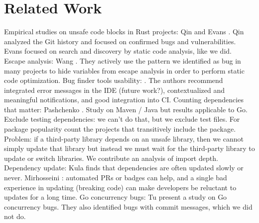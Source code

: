 \section{Related Work}
\label{sec:rw}

Empirical studies on unsafe code blocks in Rust projects: Qin \cite{qin2020} and Evans \cite{evans2020}.
Qin analyzed the Git history and focused on confirmed bugs and vulnerabilities.
Evans focused on search and discovery by static code analysis, like we did.
Escape analysis: Wang \cite{wang2020}. They actively use the pattern we identified as bug in many projects to hide variables from escape analysis in order to perform static code optimization.
Bug finder tools usability: \cite{smith2020}. The authors recommend integrated error messages in the IDE (future work?), contextualized and meaningful notifications, and good integration into CI.
Counting dependencies that matter: Pashchenko \cite{pashchenko2018}. Study on Maven / Java but results applicable to Go.
Exclude testing dependencies: we can't do that, but we exclude test files.
For package popularity count the projects that transitively include the package.
Problem: if a third-party library depends on an unsafe library, then we cannot simply update that library but instead we must wait for the third-party library to update or switch libraries.
We contribute an analysis of import depth.
Dependency update: Kula \cite{kula2017} finds that dependencies are often updated slowly or never. Mirhosseini \cite{mirhosseini2017}: automated PRs or badges can help, and a single bad experience in updating (breaking code) can make developers be reluctant to updates for a long time.
Go concurrency bugs: Tu \cite{tu2019} present a study on Go concurrency bugs. They also identified bugs with commit messages, which we did not do.
